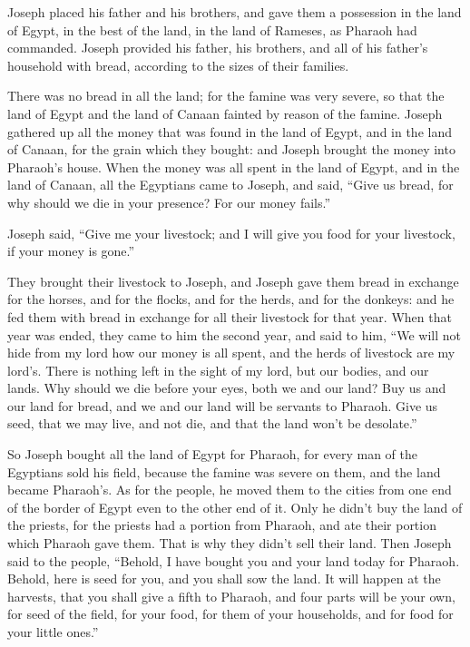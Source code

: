  Joseph placed his father and his brothers, and gave them a
possession in the land of Egypt, in the best of the land, in the land of
Rameses, as Pharaoh had commanded.  Joseph provided his
father, his brothers, and all of his father's household with bread,
according to the sizes of their families.

 There was no bread in all the land; for the famine was
very severe, so that the land of Egypt and the land of Canaan fainted by
reason of the famine.  Joseph gathered up all the money
that was found in the land of Egypt, and in the land of Canaan, for the
grain which they bought: and Joseph brought the money into Pharaoh's
house.  When the money was all spent in the land of Egypt,
and in the land of Canaan, all the Egyptians came to Joseph, and said,
``Give us bread, for why should we die in your presence? For our money
fails.''

 Joseph said, ``Give me your livestock; and I will give you
food for your livestock, if your money is gone.''

 They brought their livestock to Joseph, and Joseph gave
them bread in exchange for the horses, and for the flocks, and for the
herds, and for the donkeys: and he fed them with bread in exchange for
all their livestock for that year.  When that year was
ended, they came to him the second year, and said to him, ``We will not
hide from my lord how our money is all spent, and the herds of livestock
are my lord's. There is nothing left in the sight of my lord, but our
bodies, and our lands.  Why should we die before your eyes,
both we and our land? Buy us and our land for bread, and we and our land
will be servants to Pharaoh. Give us seed, that we may live, and not
die, and that the land won't be desolate.''

 So Joseph bought all the land of Egypt for Pharaoh, for
every man of the Egyptians sold his field, because the famine was severe
on them, and the land became Pharaoh's.  As for the people,
he moved them to the cities from one end of the border of Egypt even to
the other end of it.  Only he didn't buy the land of the
priests, for the priests had a portion from Pharaoh, and ate their
portion which Pharaoh gave them. That is why they didn't sell their
land.  Then Joseph said to the people, ``Behold, I have
bought you and your land today for Pharaoh. Behold, here is seed for
you, and you shall sow the land.  It will happen at the
harvests, that you shall give a fifth to Pharaoh, and four parts will be
your own, for seed of the field, for your food, for them of your
households, and for food for your little ones.''

